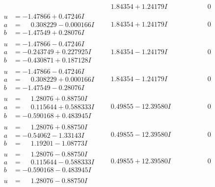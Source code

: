 \documentclass[1p]{elsarticle_modified}
\theoremstyle{definition}
\begin{document}
$$\begin{array}{c|c|c}
 & \phantom{-}1.84354 + 1.24179 I & \phantom{-0.000000 } 0 \\ \hline\begin{aligned}
u &= -1.47866 + 0.47246 I \\
a &= \phantom{-}0.308229 - 0.000166 I \\
b &= -1.47549 + 0.28076 I\end{aligned}
 & \phantom{-}1.84354 + 1.24179 I & \phantom{-0.000000 } 0 \\ \hline\begin{aligned}
u &= -1.47866 - 0.47246 I \\
a &= -0.243749 + 0.227925 I \\
b &= -0.430871 + 0.187128 I\end{aligned}
 & \phantom{-}1.84354 - 1.24179 I & \phantom{-0.000000 } 0 \\ \hline\begin{aligned}
u &= -1.47866 - 0.47246 I \\
a &= \phantom{-}0.308229 + 0.000166 I \\
b &= -1.47549 - 0.28076 I\end{aligned}
 & \phantom{-}1.84354 - 1.24179 I & \phantom{-0.000000 } 0 \\ \hline\begin{aligned}
u &= \phantom{-}1.28076 + 0.88750 I \\
a &= \phantom{-}0.115644 + 0.588333 I \\
b &= -0.590168 + 0.483945 I\end{aligned}
 & \phantom{-}0.49855 - 12.39580 I & \phantom{-0.000000 } 0 \\ \hline\begin{aligned}
u &= \phantom{-}1.28076 + 0.88750 I \\
a &= -0.54062 - 1.33143 I \\
b &= \phantom{-}1.19201 - 1.08773 I\end{aligned}
 & \phantom{-}0.49855 - 12.39580 I & \phantom{-0.000000 } 0 \\ \hline\begin{aligned}
u &= \phantom{-}1.28076 - 0.88750 I \\
a &= \phantom{-}0.115644 - 0.588333 I \\
b &= -0.590168 - 0.483945 I\end{aligned}
 & \phantom{-}0.49855 + 12.39580 I & \phantom{-0.000000 } 0 \\ \hline\begin{aligned}
u &= \phantom{-}1.28076 - 0.88750 I \\

\end{aligned}
\end{array}$$
\end{document}
